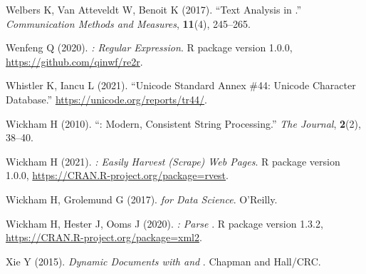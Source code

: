 \documentclass[nojss]{jss}
\begin{document}
\begin{thebibliography}{35}
Welbers K, {Van Atteveldt} W, Benoit K (2017).
\newblock \enquote{Text Analysis in .}
\newblock \emph{Communication Methods and Measures}, \textbf{11}(4), 245--265.

Wenfeng Q (2020).
\newblock \emph{:  Regular Expression}.
\newblock R package version 1.0.0,
  \urlprefix\url{https://github.com/qinwf/re2r}.

Whistler K, Iancu L (2021).
\newblock \enquote{Unicode Standard Annex \#44: Unicode Character Database.}
\newblock \urlprefix\url{https://unicode.org/reports/tr44/}.

Wickham H (2010).
\newblock \enquote{: {M}odern, Consistent String Processing.}
\newblock \emph{The  Journal}, \textbf{2}(2), 38--40.

Wickham H (2021).
\newblock \emph{: {E}asily Harvest (Scrape) Web Pages}.
\newblock R package version 1.0.0,
  \urlprefix\url{https://CRAN.R-project.org/package=rvest}.

Wickham H, Grolemund G (2017).
\newblock \emph{ for Data Science}.
\newblock O'Reilly.

Wickham H, Hester J, Ooms J (2020).
\newblock \emph{: {P}arse }.
\newblock R package version 1.3.2,
  \urlprefix\url{https://CRAN.R-project.org/package=xml2}.

Xie Y (2015).
\newblock \emph{Dynamic Documents with  and }.
\newblock Chapman and Hall/CRC.

\end{thebibliography}




\end{document}
